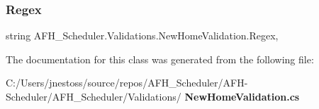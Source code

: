 \mbox{\label{class_a_f_h___scheduler_1_1_validations_1_1_new_home_validation_a8c9262bb2becf6444bd6c6525637f927}} 
\subsubsection{Regex}
{\footnotesize\ttfamily string A\+F\+H\+\_\+\+Scheduler.\+Validations.\+New\+Home\+Validation.\+Regex\hspace{0.3cm}{\ttfamily [get]}, {\ttfamily [set]}}



The documentation for this class was generated from the following file\+:\begin{DoxyCompactItemize}
\item 
C\+:/\+Users/jnestoss/source/repos/\+A\+F\+H\+\_\+\+Scheduler/\+A\+F\+H-\/\+Scheduler/\+A\+F\+H\+\_\+\+Scheduler/\+Validations/\textbf{ New\+Home\+Validation.\+cs}\end{DoxyCompactItemize}
